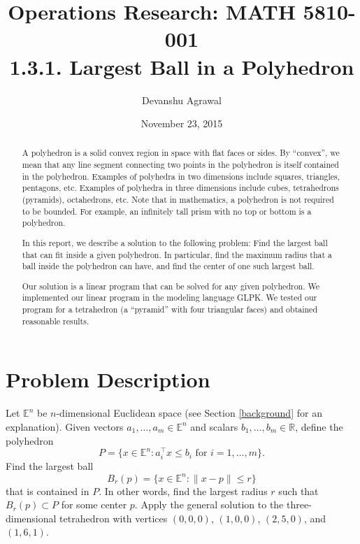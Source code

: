 \documentclass[12pt, a4paper, notitlepage]{report}
\title{Operations Research: MATH 5810-001 \\
       1.3.1. Largest Ball in a Polyhedron }  %
\author{Devanshu Agrawal}  %
\date{November 23, 2015}  %
\newcommand{\EE}{\mathbb{E}}
\newcommand{\RR}{\mathbb{R}}
\begin{document}
\maketitle

\begin{abstract}
A polyhedron is a solid convex region in space with flat faces or sides. By ``convex'', we mean that any line segment connecting two points in the polyhedron is itself contained in the polyhedron. Examples of polyhedra in two dimensions include squares, triangles, pentagons, etc. Examples of polyhedra in three dimensions include cubes, tetrahedrons (pyramids), octahedrons, etc. Note that in mathematics, a polyhedron is not required to be bounded. For example, an infinitely tall prism with no top or bottom is a polyhedron.

In this report, we describe a solution to the following problem: Find the largest ball that can fit inside a given polyhedron. In particular, find the maximum radius that a ball inside the polyhedron can have, and find the center of one such largest ball.

Our solution is a linear program that can be solved for any given polyhedron. We implemented our linear program in the modeling language GLPK. We tested our program for a tetrahedron (a ``pyramid'' with four triangular faces) and obtained reasonable results.
\end{abstract}

\newpage %

\section{Problem Description}

Let $\EE^n$ be $n$-dimensional Euclidean space (see Section \ref{background} for an explanation). Given vectors $a_1,\ldots,a_m\in\EE^n$ and scalars $b_1,\ldots,b_m\in\RR$, define the polyhedron
\[ P = \{x\in\EE^n: a_i^\top x \leq b_i \mbox{ for } i=1,\ldots,m\}. \]
Find the largest ball
\[ B_r(p) = \{x\in\EE^n: \|x-p\| \leq r\} \]
that is contained in $P$. In other words, find the largest radius $r$ such that $B_r(p)\subset P$ for some center $p$. Apply the general solution to the three-dimensional tetrahedron with vertices $(0,0,0)$, $(1,0,0)$, $(2,5,0)$, and $(1,6,1)$.
\end{document}
